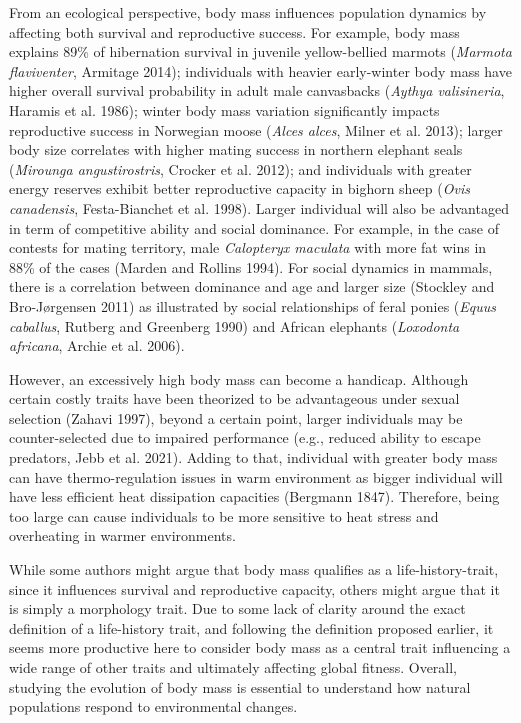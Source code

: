 \documentclass[
  12pt,
  letterpaper,
]{scrartcl}
\begin{document}
From an ecological perspective, body mass influences population dynamics
by affecting both survival and reproductive success. For example, body
mass explains 89\% of hibernation survival in juvenile yellow-bellied
marmots (\emph{Marmota flaviventer}, Armitage 2014); individuals with
heavier early-winter body mass have higher overall survival probability
in adult male canvasbacks (\emph{Aythya valisineria}, Haramis et al.
1986); winter body mass variation significantly impacts reproductive
success in Norwegian moose (\emph{Alces alces}, Milner et al. 2013);
larger body size correlates with higher mating success in northern
elephant seals (\emph{Mirounga angustirostris}, Crocker et al. 2012);
and individuals with greater energy reserves exhibit better reproductive
capacity in bighorn sheep (\emph{Ovis canadensis}, Festa-Bianchet et al.
1998). Larger individual will also be advantaged in term of competitive
ability and social dominance. For example, in the case of contests for
mating territory, male \emph{Calopteryx maculata} with more fat wins in
88\% of the cases (Marden and Rollins 1994). For social dynamics in
mammals, there is a correlation between dominance and age and larger
size (Stockley and Bro-Jørgensen 2011) as illustrated by social
relationships of feral ponies (\emph{Equus caballus}, Rutberg and
Greenberg 1990) and African elephants (\emph{Loxodonta africana}, Archie
et al. 2006).

However, an excessively high body mass can become a handicap. Although
certain costly traits have been theorized to be advantageous under
sexual selection (Zahavi 1997), beyond a certain point, larger
individuals may be counter-selected due to impaired performance (e.g.,
reduced ability to escape predators, Jebb et al. 2021). Adding to that,
individual with greater body mass can have thermo-regulation issues in
warm environment as bigger individual will have less efficient heat
dissipation capacities (Bergmann 1847). Therefore, being too large can
cause individuals to be more sensitive to heat stress and overheating in
warmer environments.

While some authors might argue that body mass qualifies as a
life-history-trait, since it influences survival and reproductive
capacity, others might argue that it is simply a morphology trait. Due
to some lack of clarity around the exact definition of a life-history
trait, and following the definition proposed earlier, it seems more
productive here to consider body mass as a central trait influencing a
wide range of other traits and ultimately affecting global fitness.
Overall, studying the evolution of body mass is essential to understand
how natural populations respond to environmental changes.
\end{document}
